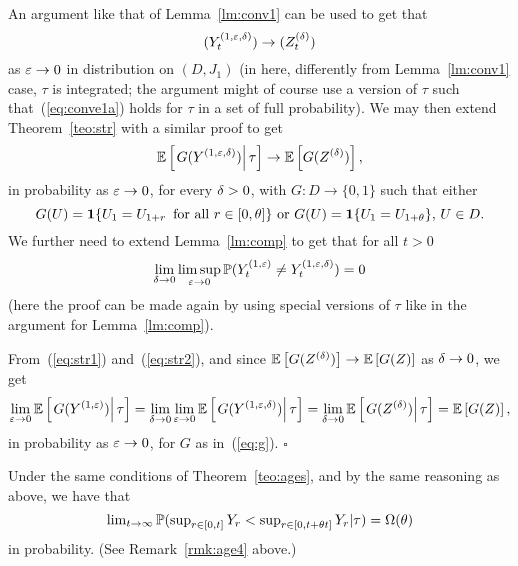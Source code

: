 An argument like that of Lemma~\ref{lm:conv1} can be used to get that
\begin{equation}
\label{eq:conve1a}
(\yoed_t)\to(\bzd_t)
\end{equation}
as $\varepsilon\to0$ in distribution on $(D,J_1)$ (in here, differently from Lemma~\ref{lm:conv1} case, $\tau$ is integrated; the argument might of course
use 
a version of $\tau$ such that~(\ref{eq:conve1a}) holds for $\tau$ in a set of full probability). We may then extend Theorem~\ref{teo:str} with a
similar 
proof to get
\begin{equation}
\label{eq:str1}
\esp\left[\left.G(Y^{(1,\eps,\d)})\right|\tau\right]\to\esp\left[G(\bzd)\right],
\end{equation}
in probability as $\varepsilon\to0$, for every $\delta>0$, with $G:D\to\{0,1\}$ such that either
\begin{equation}
\label{eq:g}
G(U)=\1\{U_1=U_{1+r}\,\mbox{ for all }r\in[0,\theta]\}\mbox{ or }G(U)=\1\{U_1=U_{1+\theta}\},\,U\in D. 
\end{equation}
We further need to extend Lemma~\ref{lm:comp}
to get that for all $t>0$
\begin{equation}
\label{eq:str2}
\lim_{\delta\to0}\limsup_{\eps\to0}\P(Y^{(1,\eps)}_t\ne Y^{(1,\eps,\d)}_t)=0
\end{equation}
(here the proof can be made again by using special versions of $\tau$ like in the argument for Lemma~\ref{lm:comp}).

From~(\ref{eq:str1}) and~(\ref{eq:str2}), and since ${\mathbb E}\left[G(Z^{(\delta)})\right]\to{\mathbb E}\left[G(Z)\right]$ as $\delta\to0$, we get
\begin{equation}\label{eq:str3}
\lim_{\eps\to0}\esp\left[\left.G(Y^{(1,\eps)})\right|\tau\right]
=\lim_{\delta\to0}\lim_{\eps\to0}\esp\left[\left.G(Y^{(1,\eps,\d)})\right|\tau\right]
=\lim_{\delta\to0}\esp\left[\left.G(\bzd)\right|\tau\right]
=\esp\left[G(Z)\right],
\end{equation}
in probability as $\varepsilon\to0$, for $G$ as in~(\ref{eq:g}).
$\square$



\begin{rmk}
\label{rmk:strqage}
Under the same conditions of Theorem~\ref{teo:ages}, and by the same reasoning as above, we have that
\begin{equation}
\label{eq:strqage}
\textstyle \lim_{t\to\infty}\P(\sup_{r\in[0,t]}Y_r<\sup_{r\in[0,t+\theta t]}Y_{r}|\tau)=\Omega(\theta)
\end{equation}
in probability. (See Remark~\ref{rmk:age4} above.)
\end{rmk}



